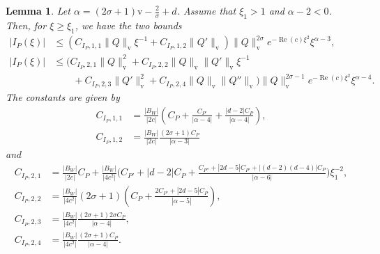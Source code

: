 \documentclass[11pt]{article}
\DeclareMathOperator{\real}{Re}
\newcommand{\normv}{\mathrm{v}}
\newtheorem{lemma}[definition]{Lemma}
\begin{document}
\begin{lemma}\label{lemma:I-P-refined}
  Let \(\alpha = (2\sigma + 1)\normv - \frac{2}{\sigma} + d\). Assume
  that \(\xi_{1} > 1\) and \(\alpha - 2 < 0\). Then, for
  \(\xi \geq \xi_{1}\), we have the two bounds
  \begin{align*}
    |I_{P}(\xi)|
    &\leq (
      C_{I_{P},1,1}\|Q\|_{\normv}\xi^{-1}
      + C_{I_{P},1,2}\|Q'\|_{\normv}
      )\|Q\|_{\normv}^{2\sigma}e^{-\real(c)\xi^{2}}
      \xi^{\alpha - 3},\\
    |I_{P}(\xi)|
    &\leq \Big(
    C_{I_{P},2,1}\|Q\|_{\normv}^{2}
    + C_{I_{P},2,2}\|Q\|_{\normv}\|Q'\|_{\normv}\xi^{-1}\\
    &\qquad+ C_{I_{P},2,3}\|Q'\|_{\normv}^{2}
    + C_{I_{P},2,4}\|Q\|_{\normv}\|Q''\|_{\normv}
    \Big)\|Q\|_{\normv}^{2\sigma - 1}e^{-\real(c)\xi^{2}}
    \xi^{\alpha - 4}.
  \end{align*}
  The constants are given by
  \begin{align*}
    C_{I_{P},1,1}
    &= \frac{|B_{W}|}{|2c|}\left(
      C_{P}
      + \frac{C_{P'}}{|\alpha - 4|}
      + \frac{|d - 2|C_{P}}{|\alpha - 4|}
      \right),\\
    C_{I_{P},1,2}
    &= \frac{|B_{W}|}{|2c|}
      \frac{(2\sigma + 1)C_{P}}{|\alpha - 3|}
  \end{align*}
  and
  \begin{align*}
    C_{I_{P},2,1}
    &= \frac{|B_{W}|}{|2c|}C_{P} + \frac{|B_{W}|}{|4c^{2}|}\Bigg(
      C_{P'}
      + |d - 2|C_{P}
      + \frac{C_{P''} + |2d - 5|C_{P'} + |(d - 2)(d - 4)|C_{P}}{|\alpha - 6|}
      \Bigg)\xi_{1}^{-2},\\
    C_{I_{P},2,2}
    &= \frac{|B_{W}|}{|4c^{2}|}(2\sigma + 1)\left(
      C_{P}
      + \frac{2C_{P'} + |2d - 5|C_{P}}{|\alpha - 5|}
      \right),\\
    C_{I_{P},2,3}
    &= \frac{|B_{W}|}{|4c^{2}|}\frac{(2\sigma + 1)2\sigma C_{P}}{|\alpha - 4|},\\
    C_{I_{P},2,4}
    &= \frac{|B_{W}|}{|4c^{2}|}\frac{(2\sigma + 1)C_{P}}{|\alpha - 4|}.
  \end{align*}
\end{lemma}
\end{document}
